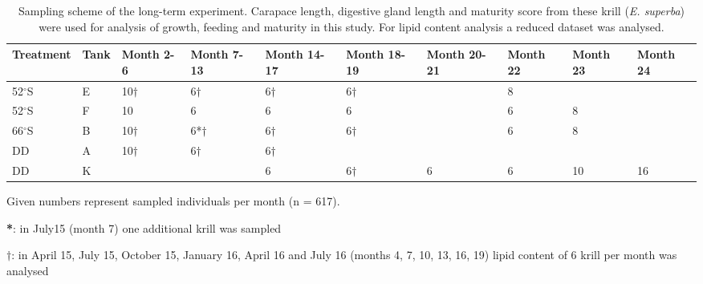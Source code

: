 \begin{table}[] \caption{Sampling scheme of the long-term experiment. Carapace
        length, digestive gland length and maturity score from these krill
        (\textit{E. superba}) were used for analysis of growth, feeding and
        maturity in this study. For lipid content analysis a reduced dataset
        was analysed.} 
        \label{Tab2_1}
{\scriptsize
\begin{tabular}{@{}llllllllll@{}}
\toprule
        \textbf{Treatment} & \textbf{Tank} & \textbf{Month 2-6} & \textbf{Month 7-13} & \textbf{Month 14-17} & \textbf{Month 18-19} & \textbf{Month 20-21} & \textbf{Month 22} & \textbf{Month 23} & \textbf{Month 24} \\ \midrule
52$^{\circ}$S      & E    & 10$\dagger$       & 6$\dagger$         & 6$\dagger$           & 6$\dagger$          &             & 8        &          &          \\
52$^{\circ}$S      & F    & 10        & 6          & 6            & 6           &             & 6        & 8        &          \\
66$^{\circ}$S      & B    & 10$\dagger$       & 6*$\dagger$        & 6$\dagger$           & 6$\dagger$          &             & 6        & 8        &          \\
DD        & A    & 10$\dagger$       & 6$\dagger$         & 6$\dagger$           &             &             &          &          &          \\
DD        & K    &           &            & 6            & 6$\dagger$          & 6           & 6        & 10       & 16       \\ \bottomrule
\end{tabular}
    \begin{tablenotes}
      \item Given numbers represent sampled individuals per month (n = 617).
      \item \textbf{*}: in July15 (month 7) one additional krill was sampled
      \item $\mathbf{\dagger}$: in April 15, July 15, October 15, January 16, April 16 and July 16 (months 4, 7, 10, 13, 16, 19) lipid content of 6 krill per month was analysed
     \end{tablenotes}

}
\end{table}
